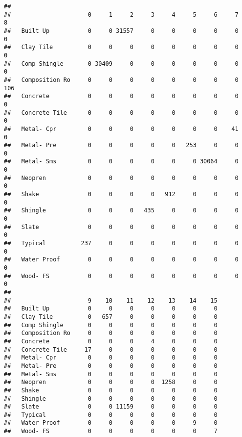 \documentclass[]{article}
\newenvironment{Shaded}{\begin{snugshade}}{\end{snugshade}}
\newcommand{\KeywordTok}[1]{\textcolor[rgb]{0.13,0.29,0.53}{\textbf{#1}}}
\newcommand{\NormalTok}[1]{#1}
\newcommand{\OperatorTok}[1]{\textcolor[rgb]{0.81,0.36,0.00}{\textbf{#1}}}
\begin{document}
\begin{verbatim}
##                 
##                      0     1     2     3     4     5     6     7     8
##   Built Up           0     0 31557     0     0     0     0     0     0
##   Clay Tile          0     0     0     0     0     0     0     0     0
##   Comp Shingle       0 30409     0     0     0     0     0     0     0
##   Composition Ro     0     0     0     0     0     0     0     0   106
##   Concrete           0     0     0     0     0     0     0     0     0
##   Concrete Tile      0     0     0     0     0     0     0     0     0
##   Metal- Cpr         0     0     0     0     0     0     0    41     0
##   Metal- Pre         0     0     0     0     0   253     0     0     0
##   Metal- Sms         0     0     0     0     0     0 30064     0     0
##   Neopren            0     0     0     0     0     0     0     0     0
##   Shake              0     0     0     0   912     0     0     0     0
##   Shingle            0     0     0   435     0     0     0     0     0
##   Slate              0     0     0     0     0     0     0     0     0
##   Typical          237     0     0     0     0     0     0     0     0
##   Water Proof        0     0     0     0     0     0     0     0     0
##   Wood- FS           0     0     0     0     0     0     0     0     0
##                 
##                      9    10    11    12    13    14    15
##   Built Up           0     0     0     0     0     0     0
##   Clay Tile          0   657     0     0     0     0     0
##   Comp Shingle       0     0     0     0     0     0     0
##   Composition Ro     0     0     0     0     0     0     0
##   Concrete           0     0     0     4     0     0     0
##   Concrete Tile     17     0     0     0     0     0     0
##   Metal- Cpr         0     0     0     0     0     0     0
##   Metal- Pre         0     0     0     0     0     0     0
##   Metal- Sms         0     0     0     0     0     0     0
##   Neopren            0     0     0     0  1258     0     0
##   Shake              0     0     0     0     0     0     0
##   Shingle            0     0     0     0     0     0     0
##   Slate              0     0 11159     0     0     0     0
##   Typical            0     0     0     0     0     0     0
##   Water Proof        0     0     0     0     0     9     0
##   Wood- FS           0     0     0     0     0     0     7
\end{verbatim}

\begin{Shaded}
\end{Shaded}
\end{document}
